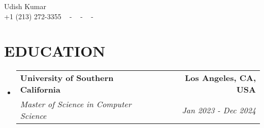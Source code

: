 \documentclass[letterpaper,11pt]{article}
\makeatletter
\newcommand{\resumeSubheading}[4]{
  \vspace{-2pt}\item
    \begin{tabular*}{1.0\textwidth}[t]{l@{\extracolsep{\fill}}r}
      \textbf{\large#1} & \textbf{\small #2} \\
      \textit{\large#3} & \textit{\small #4} \\
      
    \end{tabular*}\vspace{-7pt}
}
\newcommand{\resumeSubHeadingListStart}{\begin{itemize}[leftmargin=0.0in, label={}]}
\newcommand{\resumeSubHeadingListEnd}{\end{itemize}}
\makeatother
\begin{document}


\begin{center}
    {\huge Udish Kumar} \\ \vspace{2pt} 
    {+1 (213) 272-3355} ~ 
    \small{-}
    \href{mailto:udishkum@usc.edu}{\color{blue}{udishkum@usc.edu}} ~ 
    \small{-}
    \href{https://linkedin.com/in/iudishkumar}{ \color{blue}{linkedin.com/in/iudishkumar}}  ~
    \small{-}
    \href{https://github.com/udishkumar}{ \color{blue}{github.com/udishkumar}} ~
    \vspace{-7pt}
\end{center}

\section{\color{airforceblue}EDUCATION}
  \resumeSubHeadingListStart
    \resumeSubheading
      {University of Southern California}{Los Angeles, CA, USA}
      {Master of Science in Computer Science}{Jan 2023 - Dec 2024}
    \vspace{-4pt}
  \resumeSubHeadingListEnd
  \vspace{-10pt}

\end{document}
